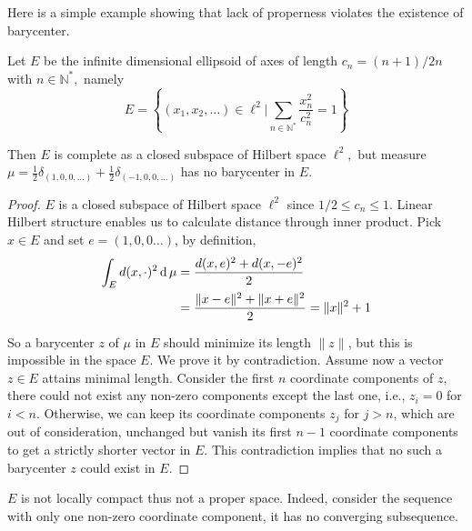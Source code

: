 Here is a simple example \cite[Example 3.1 (a)]{ohta2012barycenters}
showing that lack of properness violates the existence of barycenter.

\begin{example}
	\label{example:ellipsoid_subspaces}
	Let \( E \) be the infinite dimensional ellipsoid of axes of length \( c _ { n } = ( n + 1 ) / 2 n \) with \( n \in \mathbb { N}^* , \) namely
	\[
		E = \left\{ \left( x _ { 1 } , x _ { 2 } , \ldots \right) \in \ell^2 | \sum _ { n \in \mathbb { N }^* } \frac { x _ { n } ^ { 2 } } { c _ { n } ^ { 2 } } = 1 \right\}
	\]

	Then \( E \) is complete as a closed subspace of Hilbert space $\ell^2,$
	but measure $\mu = \frac{1}{2}\delta _ { ( 1,0,0 , \ldots ) } + \frac{1}{2} \delta _ { ( - 1,0,0 , \ldots ) } $  has no barycenter in \( E \).
\end{example}

\begin{proof}
	$E$ is a closed subspace of Hilbert space $\ell^2$ since $ 1 / 2 \leq c_{n} \leq 1$.
	Linear Hilbert structure enables us to calculate distance through inner product.
	Pick $ x \in E$ and set $ e=(1,0,0\ldots)$, by definition,
	\begin{align*}
		\int_{E} d(x, \cdot)^2 \operatorname{d} \mu & = \frac{d(x,e)^2+d(x,-e)^2 }{2}                         \\
		                                 & =\frac{\| x - e \|^2 + \| x + e \|^2}{2} =\| x \|^2 + 1
	\end{align*}

	So a barycenter $z$ of $\mu$ in $E$ should minimize its length $\| z \|$,
	but this is impossible in the space $E$.
	We prove it by contradiction.
	Assume now a vector $z \in E$ attains minimal length.
	Consider the first $n$ coordinate components of $z$,
	there could not exist any non-zero components except the last one, i.e., $z_i =0$ for $i<n$.
	Otherwise, we can keep its coordinate components $z_j$ for $j>n$,
	which are out of consideration,
	unchanged but vanish its first $n-1$ coordinate components to get a strictly shorter vector in $E$.
	This contradiction implies that no such a barycenter $z$ could exist in $E$.
\end{proof}

\begin{rmk}
	$E$ is not locally compact thus not a proper space.
	Indeed, consider the sequence with only one non-zero coordinate component, it has no converging subsequence.
\end{rmk}

